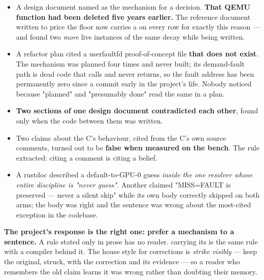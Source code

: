 \documentclass[10.5pt]{article}
\begin{document}
\begin{itemize}
\item A design document named  as the mechanism for
  a decision. \textbf{That QEMU function had been deleted five years earlier.} The reference
  document written to price the floor now carries a  on every row for exactly this
  reason — and found two \emph{more} live instances of the same decay while being written.
\item A refactor plan cited a userfaultfd proof-of-concept file \textbf{that does not exist}. The
  mechanism was planned four times and never built; its demand-fault path is dead code that calls
   and never returns, so the fault address has been permanently zero since a
  commit early in the project's life. Nobody noticed because "planned" and "presumably done" read
  the same in a plan.
\item \textbf{Two sections of one design document contradicted each other}, found only when the
  code between them was written.
\item Two claims about the C's behaviour, cited from the C's own source comments, turned out to be
  \textbf{false when measured on the bench}. The rule extracted: citing a comment is citing a
  belief.
\item A rustdoc described a default-to-GPU-0 guess \emph{inside the one resolver whose entire
  discipline is "never guess"}. Another claimed "MISS=FAULT is preserved — never a silent skip"
  while its own body correctly skipped on both arms; the body was right and the sentence was wrong
  about the most-cited exception in the codebase.
\end{itemize}

\textbf{The project's response is the right one: prefer a mechanism to a sentence.} A rule stated
only in prose has no reader.  carrying its  is the same rule with
a compiler behind it. The house style for corrections is \emph{strike visibly} — keep the original,
struck, with the correction and its evidence — so a reader who remembers the old claim learns it
was wrong rather than doubting their memory.
\end{document}

